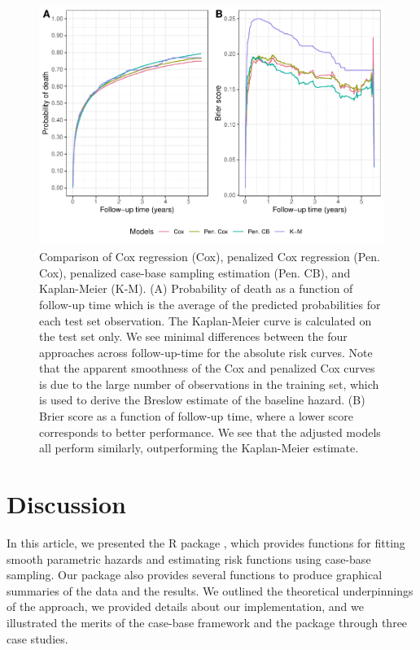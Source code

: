 \begin{figure}[ht]
\includegraphics[width=\textwidth,keepaspectratio=true]{./cs3FinalBrier-1} \caption{Comparison of Cox regression (Cox), penalized Cox regression (Pen. Cox), penalized case-base sampling estimation (Pen. CB), and Kaplan-Meier (K-M). (A) Probability of death as a function of follow-up time which is the average of the predicted probabilities for each test set observation. The Kaplan-Meier curve is calculated on the test set only. We see minimal differences between the four approaches across follow-up-time for the absolute risk curves. Note that the apparent smoothness of the Cox and penalized Cox curves is due to the large number of observations in the training set, which is used to derive the Breslow estimate of the baseline hazard. (B) Brier score as a function of follow-up time, where a lower score corresponds to better performance. We see that the adjusted models all perform similarly, outperforming the Kaplan-Meier estimate.}\label{fig:cs3FinalBrier}
\end{figure}

\hypertarget{discussion}{%
\section{Discussion}\label{discussion}}

In this article, we presented the R package , which provides functions for fitting smooth parametric hazards and estimating risk functions using case-base sampling. Our package also provides several functions to produce graphical summaries of the data and the results. We outlined the theoretical underpinnings of the approach, we provided details about our implementation, and we illustrated the merits of the case-base framework and the package through three case studies.

